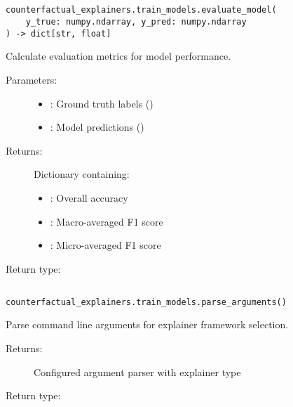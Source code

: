 \subsection{}
\label{func:evaluate_model}

\begin{lstlisting}
counterfactual_explainers.train_models.evaluate_model(
    y_true: numpy.ndarray, y_pred: numpy.ndarray
) -> dict[str, float]
\end{lstlisting}

Calculate evaluation metrics for model performance.

\begin{description}
    \item[Parameters:]
        \begin{itemize}
            \item {}: Ground truth labels ()
            \item {}: Model predictions ()
        \end{itemize}
    \item[Returns:] Dictionary containing:
        \begin{itemize}
            \item {}: Overall accuracy
            \item {}: Macro-averaged F1 score
            \item {}: Micro-averaged F1 score
        \end{itemize}
    \item[Return type:] 
\end{description}

\subsection{}
\label{func:parse_arguments}

\begin{lstlisting}
counterfactual_explainers.train_models.parse_arguments()
\end{lstlisting}

Parse command line arguments for explainer framework selection.

\begin{description}
    \item[Returns:] Configured argument parser with explainer type
    \item[Return type:] 
\end{description}


